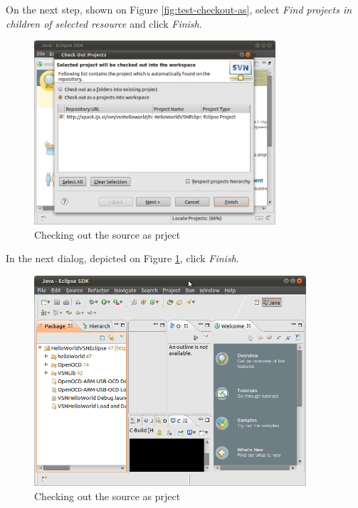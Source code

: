 \documentclass[a4paper, 10pt]{article}
\begin{document}
On the next step, shown on Figure \ref{fig:test-checkout-as}, select 
\emph{Find projects in children of selected resource} and click \emph{Finish}.

    \begin{figure}[H]
    \centering
        \includegraphics[width=0.8\textwidth]{./png-install-guide/test-project-select.png}
        \caption{Checking out the source as prject}
        \label{fig:test-project-select}
    \end{figure}

In the next dialog, depicted on
Figure \ref{fig:test-project-select},
click \emph{Finish}.

    \begin{figure}[H]
    \centering
        \includegraphics[width=0.9\textwidth]{./png-install-guide/test-got-project.png}
        \caption{Checking out the source as prject}
        \label{fig:test-got-project}
    \end{figure}
\end{document}

